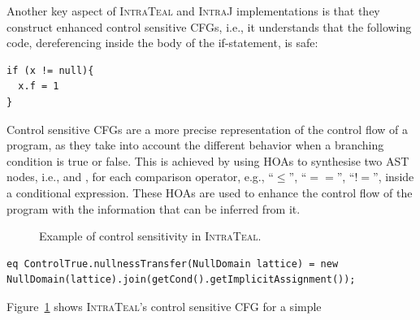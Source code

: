 Another key aspect of \textsc{IntraTeal} and \textsc{IntraJ} implementations is that they
construct enhanced control sensitive CFGs, i.e., it understands that the following code, 
dereferencing  inside the body of the if-statement, is safe:
\begin{lstlisting}[language=JastAdd]
if (x != null){
  x.f = 1
}
\end{lstlisting}
Control sensitive CFGs are a more precise representation of the control flow of a program, as they take
into account the different behavior when a branching condition is true or false. This is achieved by
using HOAs to synthesise two AST nodes, i.e.,  and , for each
comparison operator, e.g.,  ``$\le$'', ``$==$'', ``$!=$'', inside a conditional expression.
These HOAs are used to enhance the control flow of the program with the information that can be inferred from
it. 
\begin{figure}
	\centering
	\caption{\label{fig:ExampleTEAL} Example of control sensitivity in \textsc{IntraTeal}.}
\end{figure}
\begin{lstlisting}[language=JastAdd,label={lst:ControlTrueEq}, caption={Transfer function for \astnode{ControlTrue} HOA.}]
eq ControlTrue.nullnessTransfer(NullDomain lattice) = new NullDomain(lattice).join(getCond().getImplicitAssignment());
\end{lstlisting}
Figure~\ref{fig:ExampleTEAL} shows \textsc{IntraTeal}'s control sensitive CFG for a simple 
